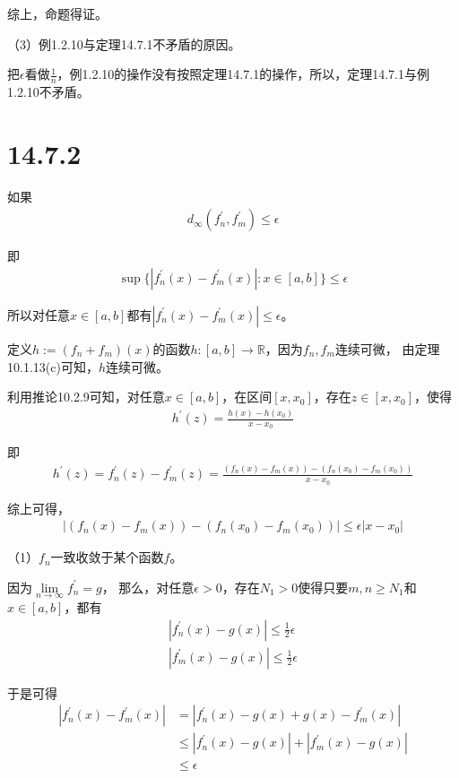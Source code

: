 \documentclass{article}
\begin{document}
综上，命题得证。

（3）例1.2.10与定理14.7.1不矛盾的原因。

把$\epsilon$看做$\frac{1}{n}$，例1.2.10的操作没有按照定理14.7.1的操作，所以，定理14.7.1与例1.2.10不矛盾。

\section*{14.7.2}

如果
\begin{align*}
  d_{\infty}(f_n^\prime, f_m^\prime) \leq \epsilon
\end{align*}

即
\begin{align*}
  \sup\{|f_n^\prime(x) - f_m^\prime(x)|: x \in [a, b]\} \leq \epsilon
\end{align*}

所以对任意$x \in [a, b]$都有$|f_n^\prime(x) - f_m^\prime(x)| \leq \epsilon$。

定义$h := (f_n + f_m)(x)$的函数$h : [a, b] \to \mathbb{R}$，因为$f_n, f_m$连续可微，
由定理10.1.13(c)可知，$h$连续可微。

利用推论10.2.9可知，对任意$x \in [a, b]$，在区间$[x, x_0]$，存在$z \in [x, x_0]$，使得
\begin{align*}
  h^\prime(z) = \frac{h(x) - h(x_0)}{x - x_0}
\end{align*}

即
\begin{align*}
  h^\prime(z) = f_n^\prime(z) - f_m^\prime(z) = \frac{(f_n(x) - f_m(x)) - (f_n(x_0) - f_m(x_0))}{x - x_0}
\end{align*}

综上可得，
\begin{align*}
  \left| (f_n(x) - f_m(x)) - (f_n(x_0) - f_m(x_0))\right|  \leq \epsilon|x - x_0|
\end{align*}

（1）$f_n$一致收敛于某个函数$f$。

因为$\lim\limits_{n \to \infty} f_n^\prime = g$，
那么，对任意$\epsilon > 0$，存在$N_1 > 0$使得只要$m, n \geq N_1$和$x \in [a, b]$，都有
\begin{align*}
  |f_n^\prime(x) - g(x)| \leq \frac{1}{2} \epsilon \\
  |f_m^\prime(x) - g(x)| \leq \frac{1}{2} \epsilon
\end{align*}

于是可得
\begin{align*}
  |f_n^\prime(x) - f_m^\prime(x)| & = |f_n^\prime(x) - g(x) + g(x) - f_m^\prime(x)|      \\
                                  & \leq |f_n^\prime(x) - g(x)| + |f_m^\prime(x) - g(x)| \\
                                  & \leq \epsilon
\end{align*}
\end{document}
